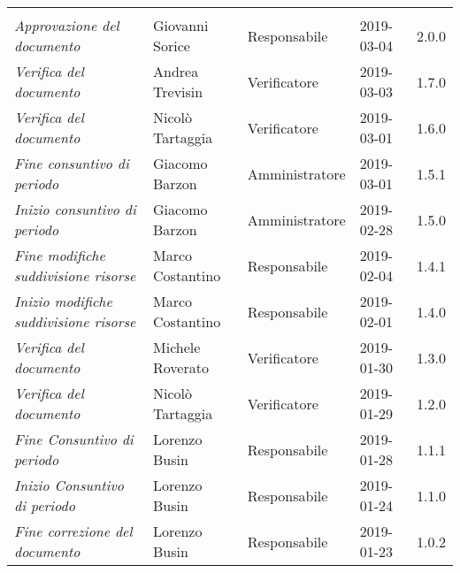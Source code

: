 \newpage
\section*{}
	\begin{longtable}{p{4cm}|C{3cm}|C{3cm}|R{2.5cm}|R{2cm}}

		 & & & & \\
		\endhead		

		\emph{Approvazione del documento} & Giovanni Sorice & Responsabile & 2019-03-04 & 2.0.0 \\
		\hline

		\emph{Verifica del documento} & Andrea Trevisin & Verificatore & 2019-03-03 & 1.7.0 \\
		\hline

		\emph{Verifica del documento} & Nicolò Tartaggia & Verificatore & 2019-03-01 & 1.6.0 \\
		\hline

		\emph{Fine consuntivo di periodo} & Giacomo Barzon & Amministratore & 2019-03-01 & 1.5.1 \\
		\hline

		\emph{Inizio consuntivo di periodo} & Giacomo Barzon & Amministratore & 2019-02-28 & 1.5.0 \\
		\hline

		\emph{Fine modifiche suddivisione risorse} & Marco Costantino & Responsabile & 2019-02-04 & 1.4.1 \\
		\hline

		\emph{Inizio modifiche suddivisione risorse} & Marco Costantino & Responsabile & 2019-02-01 & 1.4.0 \\
		\hline

		\emph{Verifica del documento} & Michele Roverato & Verificatore & 2019-01-30 & 1.3.0 \\
		\hline

		\emph{Verifica del documento} & Nicolò Tartaggia & Verificatore & 2019-01-29 & 1.2.0 \\
		\hline

		\emph{Fine Consuntivo di periodo} & Lorenzo Busin & Responsabile & 2019-01-28 & 1.1.1 \\
		\hline

		\emph{Inizio Consuntivo di periodo} & Lorenzo Busin & Responsabile & 2019-01-24 & 1.1.0 \\
		\hline

		\emph{Fine correzione del documento} & Lorenzo Busin & Responsabile & 2019-01-23 & 1.0.2 \\
		\hline


\end{longtable}
